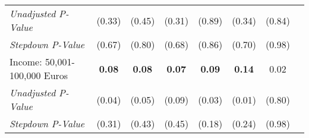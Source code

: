 \begin{tabular}{l c c c c c c c}
\quad \textit{Unadjusted P-Value} & (0.33) & (0.45) & (0.31) & (0.89) & (0.34) & (0.84) \\
\quad \textit{Stepdown P-Value} & (0.67) & (0.80) & (0.68) & (0.86) & (0.70) & (0.98) \\
Income: 50,001-100,000 Euros & \textbf{ 0.08 } & \textbf{ 0.08 } & \textbf{ 0.07 } & \textbf{ 0.09 } & \textbf{ 0.14 } & 0.02 \\
\quad \textit{Unadjusted P-Value} & (0.04) & (0.05) & (0.09) & (0.03) & (0.01) & (0.80) \\
\quad \textit{Stepdown P-Value} & (0.31) & (0.43) & (0.45) & (0.18) & (0.24) & (0.98) \\
\bottomrule
\end{tabular}
